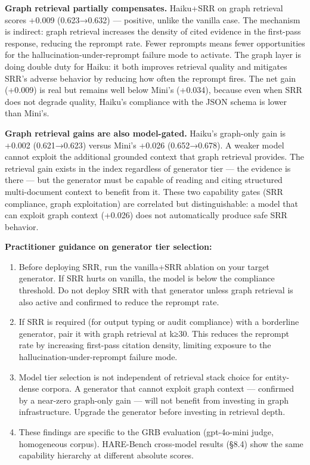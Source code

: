 \textbf{Graph retrieval partially compensates.} Haiku+SRR on graph retrieval scores +0.009 (0.623→0.632) --- positive, unlike the vanilla case. The mechanism is indirect: graph retrieval increases the density of cited evidence in the first-pass response, reducing the reprompt rate. Fewer reprompts means fewer opportunities for the hallucination-under-reprompt failure mode to activate. The graph layer is doing double duty for Haiku: it both improves retrieval quality and mitigates SRR's adverse behavior by reducing how often the reprompt fires. The net gain (+0.009) is real but remains well below Mini's (+0.034), because even when SRR does not degrade quality, Haiku's compliance with the JSON schema is lower than Mini's.

\textbf{Graph retrieval gains are also model-gated.} Haiku's graph-only gain is +0.002 (0.621→0.623) versus Mini's +0.026 (0.652→0.678). A weaker model cannot exploit the additional grounded context that graph retrieval provides. The retrieval gain exists in the index regardless of generator tier --- the evidence is there --- but the generator must be capable of reading and citing structured multi-document context to benefit from it. These two capability gates (SRR compliance, graph exploitation) are correlated but distinguishable: a model that can exploit graph context (+0.026) does not automatically produce safe SRR behavior.

\textbf{Practitioner guidance on generator tier selection:}

\begin{enumerate}
\def\labelenumi{\arabic{enumi}.}
\tightlist
\item
  Before deploying SRR, run the vanilla+SRR ablation on your target generator. If SRR hurts on vanilla, the model is below the compliance threshold. Do not deploy SRR with that generator unless graph retrieval is also active and confirmed to reduce the reprompt rate.
\item
  If SRR is required (for output typing or audit compliance) with a borderline generator, pair it with graph retrieval at k≥30. This reduces the reprompt rate by increasing first-pass citation density, limiting exposure to the hallucination-under-reprompt failure mode.
\item
  Model tier selection is not independent of retrieval stack choice for entity-dense corpora. A generator that cannot exploit graph context --- confirmed by a near-zero graph-only gain --- will not benefit from investing in graph infrastructure. Upgrade the generator before investing in retrieval depth.
\item
  These findings are specific to the GRB evaluation (gpt-4o-mini judge, homogeneous corpus). HARE-Bench cross-model results (§8.4) show the same capability hierarchy at different absolute scores.
\end{enumerate}

